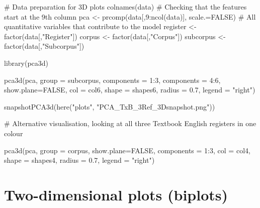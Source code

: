 \documentclass[
  letterpaper,
  DIV=11,
  numbers=noendperiod]{scrreprt}
\newenvironment{Shaded}{\begin{snugshade}}{\end{snugshade}}
\newcommand{\AttributeTok}[1]{\textcolor[rgb]{0.40,0.45,0.13}{#1}}
\newcommand{\CommentTok}[1]{\textcolor[rgb]{0.37,0.37,0.37}{#1}}
\newcommand{\ConstantTok}[1]{\textcolor[rgb]{0.56,0.35,0.01}{#1}}
\newcommand{\DecValTok}[1]{\textcolor[rgb]{0.68,0.00,0.00}{#1}}
\newcommand{\FloatTok}[1]{\textcolor[rgb]{0.68,0.00,0.00}{#1}}
\newcommand{\FunctionTok}[1]{\textcolor[rgb]{0.28,0.35,0.67}{#1}}
\newcommand{\NormalTok}[1]{\textcolor[rgb]{0.00,0.23,0.31}{#1}}
\newcommand{\OtherTok}[1]{\textcolor[rgb]{0.00,0.23,0.31}{#1}}
\newcommand{\SpecialCharTok}[1]{\textcolor[rgb]{0.37,0.37,0.37}{#1}}
\newcommand{\StringTok}[1]{\textcolor[rgb]{0.13,0.47,0.30}{#1}}
\begin{document}
\begin{Shaded}
\begin{Highlighting}[]
\CommentTok{\# Data preparation for 3D plots}
\FunctionTok{colnames}\NormalTok{(data) }\CommentTok{\# Checking that the features start at the 9th column}
\NormalTok{pca }\OtherTok{\textless{}{-}} \FunctionTok{prcomp}\NormalTok{(data[,}\DecValTok{9}\SpecialCharTok{:}\FunctionTok{ncol}\NormalTok{(data)], }\AttributeTok{scale.=}\ConstantTok{FALSE}\NormalTok{) }\CommentTok{\# All quantitative variables that contribute to the model}
\NormalTok{register }\OtherTok{\textless{}{-}} \FunctionTok{factor}\NormalTok{(data[,}\StringTok{"Register"}\NormalTok{]) }
\NormalTok{corpus }\OtherTok{\textless{}{-}} \FunctionTok{factor}\NormalTok{(data[,}\StringTok{"Corpus"}\NormalTok{])}
\NormalTok{subcorpus }\OtherTok{\textless{}{-}} \FunctionTok{factor}\NormalTok{(data[,}\StringTok{"Subcorpus"}\NormalTok{])}

\FunctionTok{library}\NormalTok{(pca3d)}

\FunctionTok{pca3d}\NormalTok{(pca, }\AttributeTok{group =}\NormalTok{ subcorpus,}
       \AttributeTok{components =} \DecValTok{1}\SpecialCharTok{:}\DecValTok{3}\NormalTok{,}
       \AttributeTok{components =} \DecValTok{4}\SpecialCharTok{:}\DecValTok{6}\NormalTok{,}
       \AttributeTok{show.plane=}\ConstantTok{FALSE}\NormalTok{,}
       \AttributeTok{col =}\NormalTok{ col6,}
       \AttributeTok{shape =}\NormalTok{ shapes6,}
       \AttributeTok{radius =} \FloatTok{0.7}\NormalTok{,}
       \AttributeTok{legend =} \StringTok{"right"}\NormalTok{)}

\FunctionTok{snapshotPCA3d}\NormalTok{(}\FunctionTok{here}\NormalTok{(}\StringTok{"plots"}\NormalTok{, }\StringTok{"PCA\_TxB\_3Ref\_3Dsnapshot.png"}\NormalTok{))}

\CommentTok{\# Alternative visualisation, looking at all three Textbook English registers in one colour}

\FunctionTok{pca3d}\NormalTok{(pca, }\AttributeTok{group =}\NormalTok{ corpus, }
      \AttributeTok{show.plane=}\ConstantTok{FALSE}\NormalTok{,}
      \AttributeTok{components =} \DecValTok{1}\SpecialCharTok{:}\DecValTok{3}\NormalTok{,}
      \AttributeTok{col =}\NormalTok{ col4,}
      \AttributeTok{shape =}\NormalTok{ shapes4,}
      \AttributeTok{radius =} \FloatTok{0.7}\NormalTok{,}
      \AttributeTok{legend =} \StringTok{"right"}\NormalTok{)}
\end{Highlighting}
\end{Shaded}

\section{Two-dimensional plots
(biplots)}\label{two-dimensional-plots-biplots-1}
\end{document}
